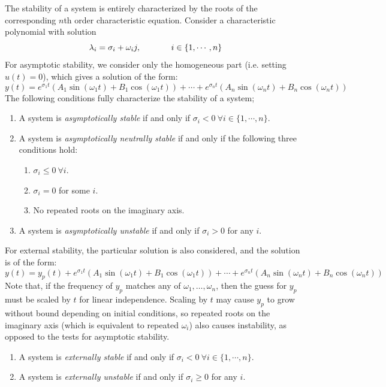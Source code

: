 The stability of a system is entirely characterized by the roots of the corresponding $n$th order characteristic equation. Consider a characteristic polynomial with solution \[\lambda_i = \sigma_i + \omega_i j,\hspace{0.5in} i\in\{1,\cdots,n\}\] For asymptotic stability, we consider only the homogeneous part (i.e. setting $u(t)=0$), which gives a solution of the form: \[y(t) = e^{\sigma_1 t}\left(A_1\sin(\omega_1t) + B_1\cos(\omega_1 t)\right) + \cdots + e^{\sigma_n t}\left(A_n\sin(\omega_n t) + B_n\cos(\omega_n t)\right)\] The following conditions fully characterize the stability of a system;
\vspace{-1em}
\begin{enumerate}
    \item[-] A system is \textit{asymptotically stable} if and only if $\sigma_i<0\ \forall i\in\{1,\cdots, n\}$.
    \item[-] A system is \textit{asymptotically neutrally stable} if and only if the following three conditions hold:\vspace{-1em}
    \begin{enumerate}
        \item[(i)] $\sigma_i \leq 0\ \forall i$.
        \item[(ii)] $\sigma_i = 0$ for some $i$.
        \item[(iii)] No repeated roots on the imaginary axis.
    \end{enumerate}
    \item[-] A system is \textit{asymptotically unstable} if and only if $\sigma_i>0$ for any $i$.
\end{enumerate}

For external stability, the particular solution is also considered, and the solution is of the form: \[y(t) = y_p(t) + e^{\sigma_1 t}\left(A_1\sin(\omega_1t) + B_1\cos(\omega_1 t)\right) + \cdots + e^{\sigma_n t}\left(A_n\sin(\omega_n t) + B_n\cos(\omega_n t)\right)\] Note that, if the frequency of $y_p$ matches any of $\omega_1,\dots, \omega_n$, then the guess for $y_p$ must be scaled by $t$ for linear independence. Scaling by $t$ may cause $y_p$ to grow without bound depending on initial conditions, so repeated roots on the imaginary axis (which is equivalent to repeated $\omega_i$) also causes instability, as opposed to the tests for asymptotic stability.
\vspace{-1em}
\begin{enumerate}
    \item[-] A system is \textit{externally stable} if and only if $\sigma_i<0\ \forall i\in\{1,\cdots, n\}$.
    \item[-] A system is \textit{externally unstable} if and only if $\sigma_i\geq0$ for any $i$.
\end{enumerate}

